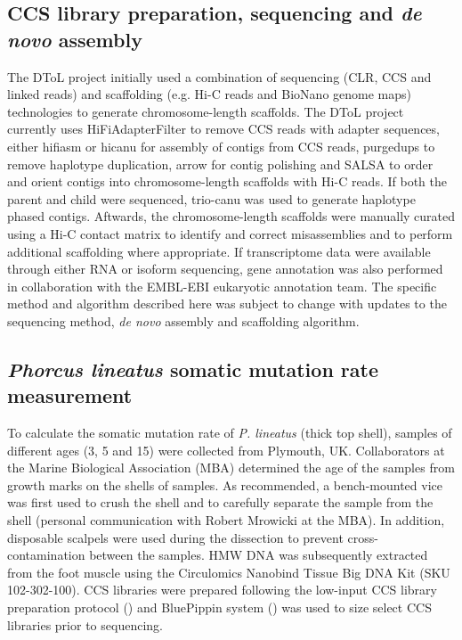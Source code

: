 \subsection{CCS library preparation, sequencing and \textit{de novo} assembly}

The DToL project initially used a combination of sequencing (CLR, CCS and linked reads) and scaffolding (e.g. Hi-C reads and BioNano genome maps) technologies to generate chromosome-length scaffolds. The DToL project currently uses HiFiAdapterFilter \cite{} to remove CCS reads with adapter sequences, either hifiasm \cite{} or hicanu \cite{} for  assembly of contigs from CCS reads, purgedups \cite{} to remove haplotype duplication, arrow \cite{} for contig polishing and SALSA \cite{} to order and orient contigs into chromosome-length scaffolds with Hi-C reads. If both the parent and child were sequenced, trio-canu was used to generate haplotype phased contigs. Aftwards, the chromosome-length scaffolds were manually curated using a Hi-C contact matrix to identify and correct misassemblies and to perform additional scaffolding where appropriate. If transcriptome data were available through either RNA or isoform sequencing, gene annotation was also performed in collaboration with the EMBL-EBI eukaryotic annotation team. The specific method and algorithm described here was subject to change with updates to the sequencing method, \textit{de novo} assembly and scaffolding algorithm. 

\subsection{\textit{Phorcus lineatus} somatic mutation rate measurement}

To calculate the somatic mutation rate of \textit{P. lineatus} (thick top shell), samples of different ages (3, 5 and 15) were collected from Plymouth, UK. Collaborators at the Marine Biological Association (MBA) determined the age of the samples from growth marks on the shells of samples. As recommended, a bench-mounted vice was first used to crush the shell and to carefully separate the sample from the shell (personal communication with Robert Mrowicki at the MBA). In addition, disposable scalpels were used during the dissection to prevent cross-contamination between the samples. HMW DNA was subsequently extracted from the foot muscle using the Circulomics Nanobind Tissue Big DNA Kit (SKU 102-302-100). CCS libraries were prepared following the low-input CCS library preparation protocol () and BluePippin system () was used to size select CCS libraries prior to sequencing.

